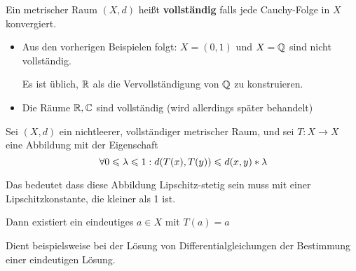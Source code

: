 \documentclass[main.tex]{subfiles}
\begin{document}
\begin{Definition}[Vollständigkeit]
  Ein metrischer Raum $(X,d)$ heißt \textbf{vollständig} falls jede Cauchy-Folge in $X$ konvergiert.
\end{Definition}
\begin{Beispiel}
  \begin{itemize}
    \item Aus den vorherigen Beispielen folgt: $X = (0,1)$ und $X = \mathbb{Q}$ sind nicht vollständig.
      \begin{Bemerkung}
        Es ist üblich, $\mathbb{R}$ als die Vervollständigung von $\mathbb{Q}$ zu konstruieren.
      \end{Bemerkung}
    \item Die Räume $\mathbb{R},\mathbb{C}$ sind vollständig (wird allerdings später behandelt)
  \end{itemize}
\end{Beispiel}

\begin{Theorem}
  Sei $(X,d)$ ein nichtleerer, vollständiger metrischer Raum, und sei $T : X \to X$ eine Abbildung mit der Eigenschaft
  $$\;\forall 0 \leqslant \lambda \leqslant 1 : d(T(x),T(y)) \leqslant d(x,y)* \lambda$$
  \begin{Bemerkung}
    Das bedeutet dass diese Abbildung Lipschitz-stetig sein muss mit einer Lipschitzkonstante, die kleiner als 1 ist.
  \end{Bemerkung}
  Dann existiert ein eindeutiges $a \in X$ mit $T(a) = a$
\end{Theorem}

\begin{Bemerkung}
  Dient beispielsweise bei der Lösung von Differentialgleichungen der Bestimmung einer eindeutigen Lösung.
\end{Bemerkung}
\end{document}
